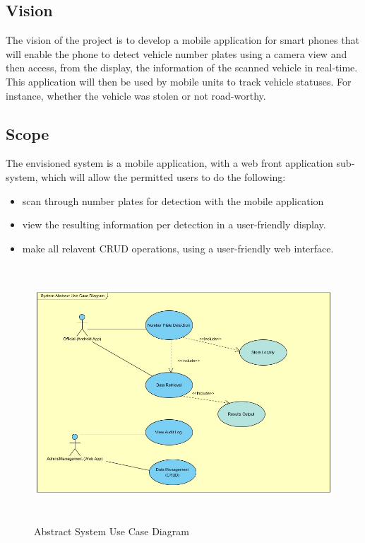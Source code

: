 \documentclass[12pt]{article}
\begin{document}
                		\subsection{Vision}
                				The vision of the project is to develop a mobile application for smart phones that will enable the phone to detect vehicle number plates using a camera view and then access, from the display, the information of the scanned vehicle in real-time. This application will then be used by mobile units to track vehicle statuses. For instance, whether the vehicle was stolen or not road-worthy.
                		\subsection{Scope}
                			
                				The envisioned system is a mobile application, with a web front application sub-system, which will allow the permitted users to do the following:
                			    		\begin{itemize}
                								\item scan through number plates for detection with the mobile application
                				                \item view the resulting information per detection in a user-friendly display.
                				                \item make all relavent CRUD operations, using a user-friendly web interface.
                				                
                			            \end{itemize}
                			            
           						\begin{figure}[h]
			           				\centering
			           				\includegraphics[width=5.51in, height=3.77in]{Pictures/AbstractUseCase.jpg}
			           				\caption{Abstract System Use Case Diagram}
           						\end{figure}
                				\FloatBarrier
                				
\end{document}
